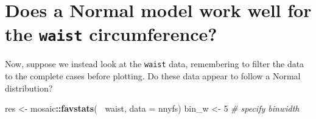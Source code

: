 \documentclass[
]{book}
\newenvironment{Shaded}{\begin{snugshade}}{\end{snugshade}}
\newcommand{\CommentTok}[1]{\textcolor[rgb]{0.56,0.35,0.01}{\textit{#1}}}
\newcommand{\DataTypeTok}[1]{\textcolor[rgb]{0.13,0.29,0.53}{#1}}
\newcommand{\DecValTok}[1]{\textcolor[rgb]{0.00,0.00,0.81}{#1}}
\newcommand{\KeywordTok}[1]{\textcolor[rgb]{0.13,0.29,0.53}{\textbf{#1}}}
\newcommand{\NormalTok}[1]{#1}
\newcommand{\OperatorTok}[1]{\textcolor[rgb]{0.81,0.36,0.00}{\textbf{#1}}}
\newcommand{\StringTok}[1]{\textcolor[rgb]{0.31,0.60,0.02}{#1}}
\begin{document}
\hypertarget{does-a-normal-model-work-well-for-the-waist-circumference}{%
\section{\texorpdfstring{Does a Normal model work well for the \texttt{waist} circumference?}{Does a Normal model work well for the waist circumference?}}\label{does-a-normal-model-work-well-for-the-waist-circumference}}

Now, suppose we instead look at the \texttt{waist} data, remembering to filter the data to the complete cases before plotting. Do these data appear to follow a Normal distribution?

\begin{Shaded}
\begin{Highlighting}[]
\NormalTok{res <-}\StringTok{ }\NormalTok{mosaic}\OperatorTok{::}\KeywordTok{favstats}\NormalTok{(}\OperatorTok{~}\StringTok{ }\NormalTok{waist, }\DataTypeTok{data =}\NormalTok{ nnyfs)}
\NormalTok{bin_w <-}\StringTok{ }\DecValTok{5} \CommentTok{# specify binwidth}


\end{Highlighting}
\end{Shaded}
\end{document}
